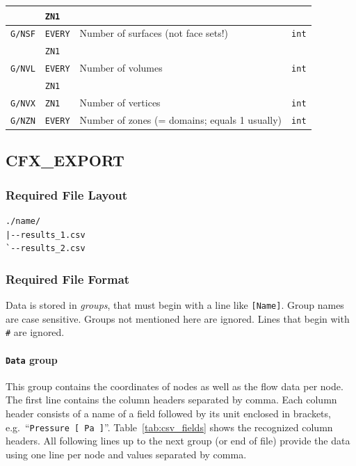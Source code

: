 \documentclass[a4paper,10pt]{article}
\begin{document}
\begin{table}
\begin{tabular}{llp{9cm}l}
                         & \texttt{ZN1}     & & \\ \hline
    \texttt{G/NSF}      & \texttt{EVERY}   & Number of surfaces (not face sets!)           & \texttt{int} \\
                         & \texttt{ZN1}     &                                               & \\ \hline          
    \texttt{G/NVL}      & \texttt{EVERY}   & Number of volumes                             & \texttt{int}\\
                         & \texttt{ZN1}     &                                               & \\ \hline          
    \texttt{G/NVX}      & \texttt{ZN1}     & Number of vertices                            & \texttt{int} \\
    \texttt{G/NZN}      & \texttt{EVERY}   & Number of zones (= domains; equals 1 usually)  & \texttt{int}
  \end{tabular}
\end{table}

\clearpage
\subsection{CFX\_EXPORT}
\label{sec:cfx-export}
\subsubsection{Required File Layout}
\begin{verbatim}
./name/
|--results_1.csv
`--results_2.csv
\end{verbatim}

\subsubsection{Required File Format}
Data  is  stored   in  \emph{groups},  that  must  begin   with  a  line  like
\texttt{[Name]}. Group names are case sensitive. Groups not mentioned here are
ignored. Lines that begin with \texttt{\#} are ignored.

\paragraph{\texttt{Data} group}
This group  contains the  coordinates of nodes  as well  as the flow  data per
node.  The  first line  contains the column  headers separated by  comma. Each
column header consists of  a name of a field followed by  its unit enclosed in
brackets, e.g.\ ``\texttt{Pressure [ Pa ]}''. Table~\ref{tab:csv_fields} shows
the recognized  column headers. All following  lines up to the  next group (or
end of file) provide the data using  one line per node and values separated by
comma.
\end{document}
